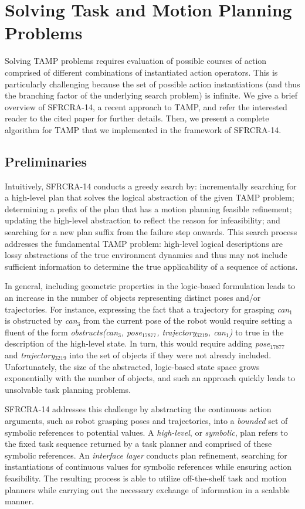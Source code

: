 \section{Solving Task and Motion Planning Problems}
Solving TAMP problems requires evaluation of
possible courses of action comprised of different combinations of
instantiated action operators. This is particularly challenging
because the set of possible action instantiations (and thus the
branching factor of the underlying search problem) is infinite.
We give a brief overview of SFRCRA-14, a recent approach to TAMP, and
refer the interested reader to the cited paper for further details.
Then, we present a complete algorithm for TAMP that we implemented in
the framework of SFRCRA-14.

\subsection{Preliminaries}
Intuitively, SFRCRA-14 conducts a greedy search by: incrementally
searching for a high-level plan that solves the logical abstraction
of the given TAMP problem; determining a prefix of the plan that has a
motion planning feasible refinement; updating the high-level
abstraction to reflect the reason for infeasibility; and searching for
a new plan suffix from the failure step onwards. This search process
addresses the fundamental TAMP problem: high-level
logical descriptions are lossy abstractions of the true environment
dynamics and thus may not include sufficient information to
determine the true applicability of a sequence of actions.

In general, including geometric properties in the logic-based formulation leads to an
increase in the number of objects representing distinct poses and/or trajectories. For
instance, expressing the fact that a trajectory for grasping \emph{can$_1$} is obstructed by
\emph{can$_3$} from the current pose of the robot would require setting a fluent of the
form \emph{obstructs(can$_3$, pose$_{17877}$, trajectory$_{3219}$, can$_1$)} to true in
the description of the high-level state. In turn, this would require adding
\emph{pose$_{17877}$} and \emph{trajectory$_{3219}$} into the set of objects if they were
not already included. Unfortunately, the size of the abstracted, logic-based state space
grows exponentially with the number of objects, and such an approach quickly leads to
unsolvable task planning problems.

SFRCRA-14 addresses this challenge by abstracting the continuous
action arguments, such as robot grasping poses and trajectories, into
a \emph{bounded} set of symbolic references to potential values. A
\emph{high-level}, or \emph{symbolic}, plan refers to the fixed task
sequence returned by a task planner and comprised of these symbolic
references. An \emph{interface layer} conducts plan refinement,
searching for instantiations of continuous values for symbolic
references while ensuring action feasibility.  The resulting process
is able to utilize off-the-shelf task and motion planners while
carrying out the necessary exchange of information in a scalable
manner.

